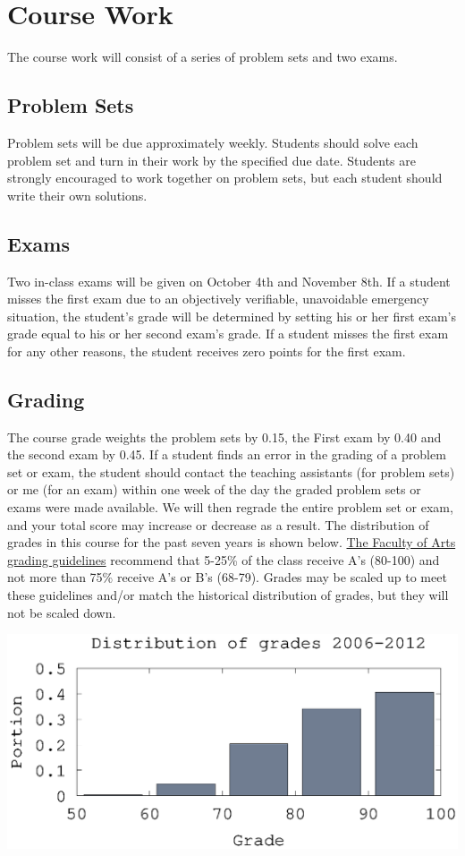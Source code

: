 \documentclass[10pt]{article}
\begin{document}
\section{Course Work}

The course work will consist of a series of problem sets and two
exams. 

\subsection{Problem Sets}
Problem sets will be due approximately weekly.  Students should solve
each problem set and turn in their work by the specified due
date. Students are strongly encouraged to work together on problem
sets, but each student should write their own solutions.

\subsection{Exams}
Two in-class exams will be given on October 4th and November 8th. If
a student misses the first exam due to an objectively verifiable,
unavoidable emergency situation, the student's grade will be
determined by setting his or her first exam's grade equal to his or her
second exam's grade. If a student misses the first exam for any other
reasons, the student receives zero points for the first exam.

\subsection{Grading}
The course grade weights the problem sets by 0.15, the First exam by
0.40 and the second exam by 0.45. If a student finds an error in the
grading of a problem set or exam, the student should contact the
teaching assistants (for problem sets) or me (for an exam) within one
week of the day the graded problem sets or exams were made
available. We will then regrade the entire problem set or exam, and
your total score may increase or decrease as a result.  The
distribution of grades in this course for the past seven years is shown
below.
\href{http://www.arts.ubc.ca/faculty-amp-staff/resources/courses-and-grading/grading-guidelines.html}
{The Faculty of Arts grading guidelines} recommend that 5-25\% of the
class receive A's (80-100) and not more than 75\% receive A's or B's
(68-79). Grades may be scaled up to meet these guidelines and/or match
the historical distribution of grades, but they will not be scaled
down. 

\begin{centering}
  \includegraphics[width=0.8\linewidth]{526gradeDist}
\end{centering}
\end{document}
